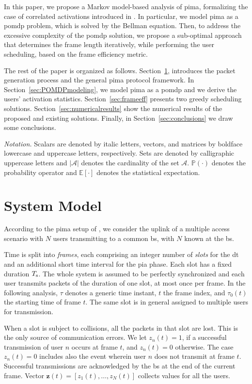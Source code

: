\documentclass[conference]{IEEEtran}
\begin{document}
In this paper, we propose a Markov model-based analysis of \ac{pima}, formalizing the case of correlated activations introduced in \cite{Rech2023Semi}. In particular, we model \ac{pima} as a \ac{pomdp} problem, which is solved by the Bellman equation. Then, to address the excessive complexity of the \ac{pomdp} solution, we propose a sub-optimal approach that determines the frame length iteratively, while performing the user scheduling, based on the frame efficiency metric.

The rest of the paper is organized as follows.  Section~\ref{sec:systemmodel}, introduces the packet generation process and the general \ac{pima} protocol framework. In Section~\ref{sec:POMDPmodeling}, we model \ac{pima} as a \ac{pomdp} and we derive the users' activation statistics. Section~\ref{sec:frameeff} presents two greedy scheduling solutions. Section~\ref{sec:numericalresults} show the numerical results of the proposed and existing solutions. Finally, in Section~\ref{sec:conclusions} we draw some conclusions.

\vspace{5pt}\noindent\emph{Notation.} Scalars are denoted by italic letters, vectors, and matrices by boldface lowercase and uppercase letters, respectively. Sets are denoted by calligraphic uppercase letters and $|\mathcal{A}|$ denotes the cardinality of the set $\mathcal{A}$. $\mathbb{P}(\cdot)$ denotes the probability operator and $\mathbb{E}[\cdot]$ denotes the statistical expectation.

\section{System Model}\label{sec:systemmodel}
According to the \ac{pima} setup of \cite{rech2023partial}, we consider the uplink of a multiple access scenario with $N$ users transmitting to a common \ac{bs}, with $N$ known at the \ac{bs}.

Time is split into {\em frames}, each comprising an integer number of {\em slots} for the \ac{dt} and an additional short time interval for the \ac{pia} phase. Each slot has a fixed duration $T_{\rm s}$. The whole system is assumed to be perfectly synchronized and each user transmits packets of the duration of one slot, at most once per frame.
In the following analysis, $\tau$ denotes a generic time instant, $t$ the frame index, and $\tau_0(t)$ the starting time of frame $t$. The same slot is in general assigned to multiple users for transmission.

When a slot is subject to collisions, all the packets in that slot are lost. This is the only source of communication errors.
We let $z_{n}(t) = 1$, if a successful transmission of user $n$ occurs at frame $t$, and $z_{n}(t) = 0$ otherwise. The case $z_n(t)=0$ includes also the event wherein user $n$ does not transmit at frame $t$. Successful transmissions are acknowledged by the \ac{bs} at the end of the current frame. Vector $\bm{z}(t) = [z_1(t), \ldots, z_N(t)]$ collects values for all the users. 
\end{document}
